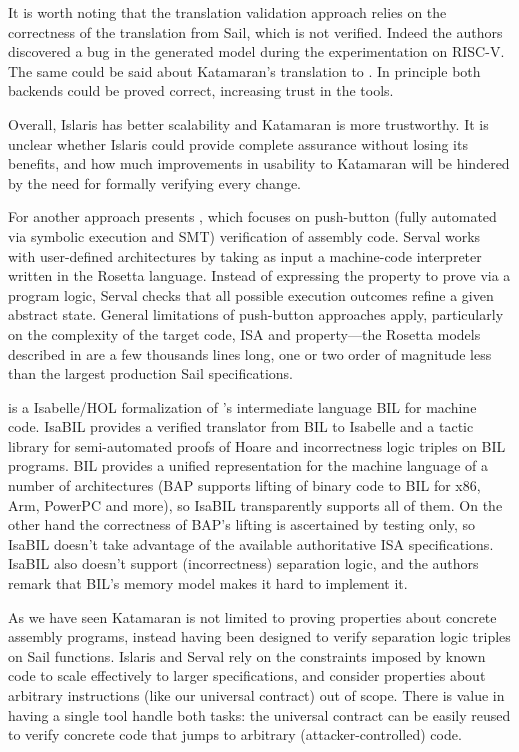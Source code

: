 It is worth noting that the translation validation approach relies on the correctness of the translation from Sail, which is not verified. Indeed the authors discovered a bug in the generated model during the experimentation on RISC-V. The same could be said about Katamaran's translation to \usail. In principle both backends could be proved correct, increasing trust in the tools.

Overall, Islaris has better scalability and Katamaran is more trustworthy. It is unclear whether Islaris could provide complete assurance without losing its benefits, and how much improvements in usability to Katamaran will be hindered by the need for formally verifying every change.

For another approach \cite{Nelson2019} presents , which focuses on push-button (\ie fully automated via symbolic execution and SMT) verification of assembly code. Serval works with user-defined architectures by taking as input a machine-code interpreter written in the Rosetta language. Instead of expressing the property to prove via a program logic, Serval checks that all possible execution outcomes refine a given abstract state. General limitations of push-button approaches apply, particularly on the complexity of the target code, ISA and property---the Rosetta models described in \cite{Nelson2019} are a few thousands lines long, one or two order of magnitude less than the largest production Sail specifications.

 \cite{Griffin2025} is a Isabelle/HOL formalization of 's \cite{Brumley2011} intermediate language BIL for machine code. IsaBIL provides a verified translator from BIL to Isabelle and a tactic library for semi-automated proofs of Hoare and incorrectness logic triples on BIL programs. BIL provides a unified representation for the machine language of a number of architectures (BAP supports lifting of binary code to BIL for x86, Arm, PowerPC and more), so IsaBIL transparently supports all of them. On the other hand the correctness of BAP's lifting is ascertained by testing only, so IsaBIL doesn't take advantage of the available authoritative ISA specifications. IsaBIL also doesn't support (incorrectness) separation logic, and the authors remark that BIL's memory model makes it hard to implement it.

As we have seen Katamaran is not limited to proving properties about concrete assembly programs, instead having been designed to verify separation logic triples on Sail functions. Islaris and Serval rely on the constraints imposed by known code to scale effectively to larger specifications, and consider properties about arbitrary instructions (like our universal contract) out of scope. There is value in having a single tool handle both tasks: the universal contract can be easily reused to verify concrete code that jumps to arbitrary (attacker-controlled) code.

